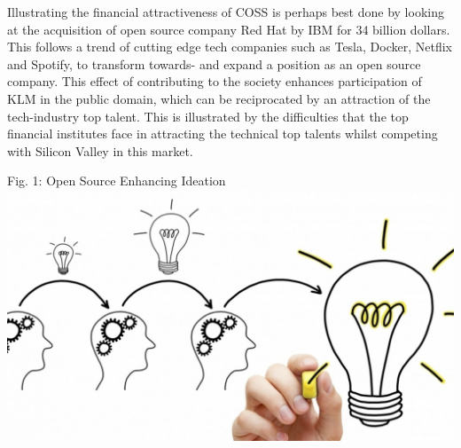 \documentclass[portrait,a0paper]{rudi-poster}  %
\begin{document}
\begin{rudiblockimethodsresultsbody}
\begin{multicols}{3}
    \indent Illustrating the financial attractiveness of COSS is perhaps best done by looking at the acquisition of open source company Red Hat by IBM for 34 billion dollars. This follows a trend of cutting edge tech companies such as Tesla, Docker, Netflix and Spotify, to transform towards- and expand a position as an open source company. This effect of contributing to the society enhances participation of KLM in the public domain, which can be reciprocated by an attraction of the tech-industry top talent. This is illustrated by the difficulties that the top financial institutes face in attracting the technical top talents whilst competing with Silicon Valley in this market.
    
    \begin{rudifig}{\hsize}{Fig. 1: Open Source Enhancing Ideation}
        \hspace{-1em}
        \includegraphics[width=700pt]{latex/Images/os0.jpg}
    \end{rudifig}
    \end{multicols}
    

\end{rudiblockimethodsresultsbody}
\end{document}
